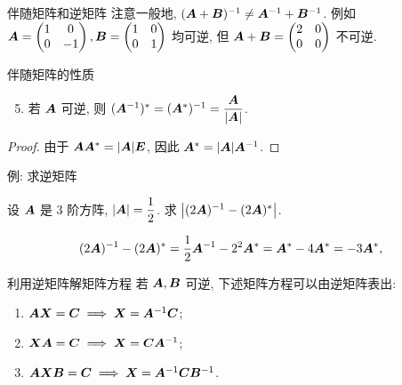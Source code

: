 \begin{frame}{伴随矩阵和逆矩阵}
	\onslide<+->
	注意一般地, $({\boldsymbol{A}}+{\boldsymbol{B}})^{-1}\neq{\boldsymbol{A}}^{-1}+{\boldsymbol{B}}^{-1}$.
	\onslide<+->
	例如 ${\boldsymbol{A}}=\begin{pmatrix}
		1&0\\0&-1
	\end{pmatrix},{\boldsymbol{B}}=\begin{pmatrix}
		1&0\\0&1
	\end{pmatrix}$ 均可逆, 但 ${\boldsymbol{A}}+{\boldsymbol{B}}=\begin{pmatrix}
		2&0\\0&0
	\end{pmatrix}$ 不可逆.
	\onslide<+->
	\begin{second}{伴随矩阵的性质}
		\begin{enumerate}
			\setcounter{enumi}{4}
			\item 若 ${\boldsymbol{A}}$ 可逆, 则 $({\boldsymbol{A}}^{-1})^*=({\boldsymbol{A}}^*)^{-1}=\dfrac{{\boldsymbol{A}}}{|{\boldsymbol{A}}|}$.
		\end{enumerate}
	\end{second}
	\onslide<+->
	\begin{proof}
		由于 ${\boldsymbol{A}}{\boldsymbol{A}}^*=|{\boldsymbol{A}}|{\boldsymbol{E}}$, 因此 ${\boldsymbol{A}}^*=|{\boldsymbol{A}}|{\boldsymbol{A}}^{-1}$.
		\onslide<+->{于是
		\[(\bfA^{-1})^*=|\bfA^{-1}|(\bfA^{-1})^{-1}=\frac{\bfA}{|\bfA|},\quad\visible<+->{(\bfA^*)^{-1}=(|\bfA|\bfA^{-1})^{-1}=\frac{\bfA}{|\bfA|}.}\qedhere\]
		}
		\vspace{-\baselineskip}
	\end{proof}
\end{frame}


\begin{frame}{例: 求逆矩阵}
	\onslide<+->
	\begin{example}
		设 ${\boldsymbol{A}}$ 是 $3$ 阶方阵, $|{\boldsymbol{A}}|=\dfrac12$.
		求 $\bigl|(2{\boldsymbol{A}})^{-1}-(2{\boldsymbol{A}})^*\bigr|$.
	\end{example}
	\onslide<+->
	\begin{solution}
		\[(2{\boldsymbol{A}})^{-1}-(2{\boldsymbol{A}})^*
		=\frac12{\boldsymbol{A}}^{-1}-2^2{\boldsymbol{A}}^*={\boldsymbol{A}}^*-4{\boldsymbol{A}}^*=-3{\boldsymbol{A}}^*,\]
		\onslide<+->{因此
		\[\bigl|(2\bfA)^{-1}-(2\bfA)^*\bigr|=-27|\bfA^*|=-27|\bfA|^2=-\frac{27}4.\]
		}
		\vspace{-\baselineskip}
	\end{solution}
\end{frame}


\begin{frame}{利用逆矩阵解矩阵方程}
	\onslide<+->
	若 ${\boldsymbol{A}},{\boldsymbol{B}}$ 可逆, 下述矩阵方程可以由逆矩阵表出:
	\begin{enumerate}
		\item ${\boldsymbol{A}}{\boldsymbol{X}}={\boldsymbol{C}}\implies {\boldsymbol{X}}={\boldsymbol{A}}^{-1}{\boldsymbol{C}}$;
		\item ${\boldsymbol{X}}{\boldsymbol{A}}={\boldsymbol{C}}\implies {\boldsymbol{X}}={\boldsymbol{C}}{\boldsymbol{A}}^{-1}$;
		\item ${\boldsymbol{A}}{\boldsymbol{X}}{\boldsymbol{B}}={\boldsymbol{C}}\implies {\boldsymbol{X}}={\boldsymbol{A}}^{-1}{\boldsymbol{C}}{\boldsymbol{B}}^{-1}$.
	\end{enumerate}
\end{frame}


